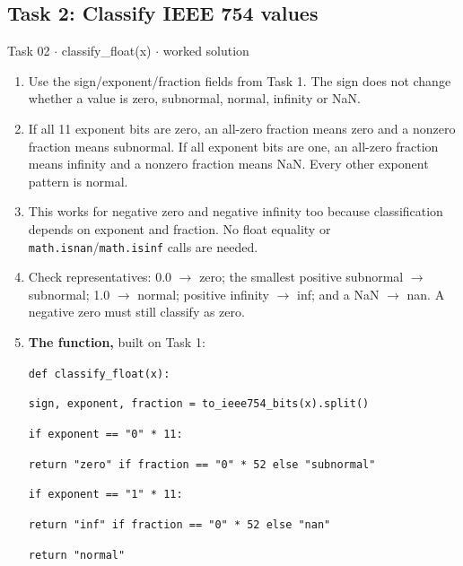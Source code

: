 \documentclass[11pt]{article}
\begin{document}
\begin{keepsection}
\end{keepsection}
\begin{keepsection}\subsection{Task 2: Classify IEEE 754 values}

\begin{workedbox}{Task 02 \ensuremath{\cdot} classify\_float(x) \ensuremath{\cdot} worked solution}
\begin{enumerate}
\item Use the sign/exponent/fraction fields from Task 1. The sign does not change whether a value is zero, subnormal, normal, infinity or NaN.
\item If all 11 exponent bits are zero, an all-zero fraction means zero and a nonzero fraction means subnormal. If all exponent bits are one, an all-zero fraction means infinity and a nonzero fraction means NaN. Every other exponent pattern is normal.
\item This works for negative zero and negative infinity too because classification depends on exponent and fraction. No float equality or \texttt{math.isnan}/\texttt{math.isinf} calls are needed.
\item Check representatives: 0.0 \ensuremath{\to} zero; the smallest positive subnormal \ensuremath{\to} subnormal; 1.0 \ensuremath{\to} normal; positive infinity \ensuremath{\to} inf; and a NaN \ensuremath{\to} nan. A negative zero must still classify as zero.
\item {}
\textbf{The function,} built on Task 1:
\begin{tcolorbox}[colback=Paperblue,colframe=Paperblue,boxrule=0pt,arc=0pt,left=7pt,right=7pt,top=5pt,bottom=5pt]\small\sloppy
\noindent\hspace*{0em}\texttt{def classify\_float(x):}\par
\noindent\hspace*{1em}\texttt{sign, exponent, fraction = to\_ieee754\_bits(x).split()}\par
\noindent\hspace*{1em}\texttt{if exponent == "0" * 11:}\par
\noindent\hspace*{3em}\texttt{return "zero" if fraction == "0" * 52 else "subnormal"}\par
\noindent\hspace*{1em}\texttt{if exponent == "1" * 11:}\par
\noindent\hspace*{3em}\texttt{return "inf" if fraction == "0" * 52 else "nan"}\par
\noindent\hspace*{1em}\texttt{return "normal"}\par
\end{tcolorbox}
\end{enumerate}
\end{workedbox}

\end{keepsection}
\end{document}

